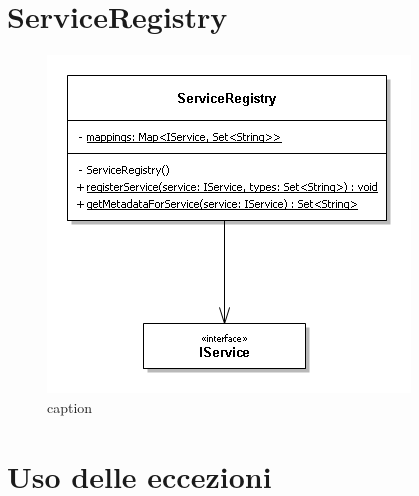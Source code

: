 \section{ServiceRegistry}
\begin{figure} [h]
	\includegraphics[width=\linewidth]{pictures/ServiceRegistry.png}
	\caption{caption}
	\label{fig:ServiceRegistry}
\end{figure}

\section{Uso delle eccezioni}